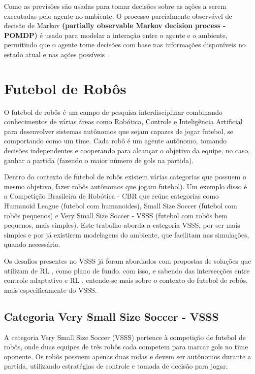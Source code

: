 Como as previsões são usadas para tomar decisões sobre as ações a serem executadas pelo agente no ambiente. O processo parcialmente observável de decisão de Markov \textbf{(partially observable Markov decision
process - POMDP)} é usado para modelar a interação entre o agente e o ambiente, permitindo que o agente tome decisões com base nas informações disponíveis no estado atual e nas ações possíveis \cite{dream_v1}.




\section{Futebol de Robôs}
O futebol de robôs é um campo de pesquisa interdisciplinar combinando conhecimentos de várias áreas como Robótica, Controle e Inteligência Artificial para desenvolver sistemas autônomos que sejam capazes de jogar futebol, se comportando como um time. Cada robô é um agente autônomo, tomando decisões independentes e cooperando para alcançar o objetivo da equipe, no caso, ganhar a partida (fazendo o maior número de gols na partida).

Dentro do contexto de futebol de robôs existem várias categorias que possuem o mesmo objetivo, fazer robôs autônomos que jogam futebol). Um exemplo disso é a Competição Brasileira de Robótica - CBR \cite{cbr_site} que reúne categorias como Humanoid League (futebol com humanoides), Small Size Soccer (futebol com robôs pequenos) e Very Small Size Soccer - VSSS (futebol com robôs bem pequenos, mais simples). Este trabalho aborda a categoria VSSS, por ser mais simples e por já existirem modelagens do ambiente, que facilitam nas simulações, quando necessário.

Os desafios presentes no VSSS já foram abordados com propostas de soluções que utilizam de RL \cite{bruno_brandao}, \cite{robocin} como plano de fundo. com isso, e sabendo das intersecções entre controle adaptativo e RL \cite{ac_rl_intersections}, entende-se mais sobre o contexto do futebol de robôs, mais especificamente do VSSS.


\subsection*{Categoria Very Small Size Soccer - VSSS }

A categoria Very Small Size Soccer (VSSS) pertence à competição de futebol de robôs, onde duas equipes de três robôs cada competem para marcar gols no time oponente. Os robôs possuem apenas duas rodas e devem ser autônomos durante a partida, utilizando estratégias de controle e tomada de decisão para jogar.

